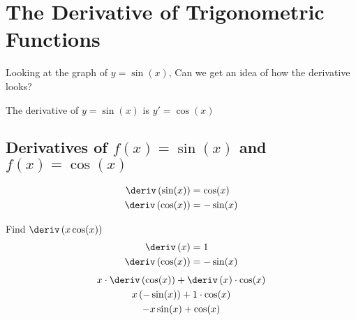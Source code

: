 
\section{The Derivative of Trigonometric Functions}
Looking at the graph of $y=\sin(x)$, Can we get an idea of how the derivative looks? \\
The derivative of $y = \sin(x)$ is $y' = \cos(x)$
\subsection{Derivatives of \texorpdfstring{$f(x) = \sin(x)$}{f(x) = sin(x)} and \texorpdfstring{$f(x) = \cos(x)$}{f(x) = cos(x)}}
\begin{align}
    \deriv \left(\sin(x)\right) &= \cos(x) \\
    \deriv \left(\cos(x)\right) &= -\sin(x)
\end{align}
\begin{example}
    Find $\deriv \left(x\cos(x)\right)$
    \begin{align*}
        \deriv \left(x\right) &= 1 \\
        \deriv \left(\cos(x)\right) &= -\sin(x)
    \end{align*}
    \begin{gather*}
        x \cdot \deriv \left(\cos(x)\right) + \deriv \left(x\right) \cdot \cos(x) \\
        x \left(-\sin(x)\right) + 1 \cdot \cos(x) \\
        -x\sin(x) + \cos(x)
    \end{gather*}
\end{example}
